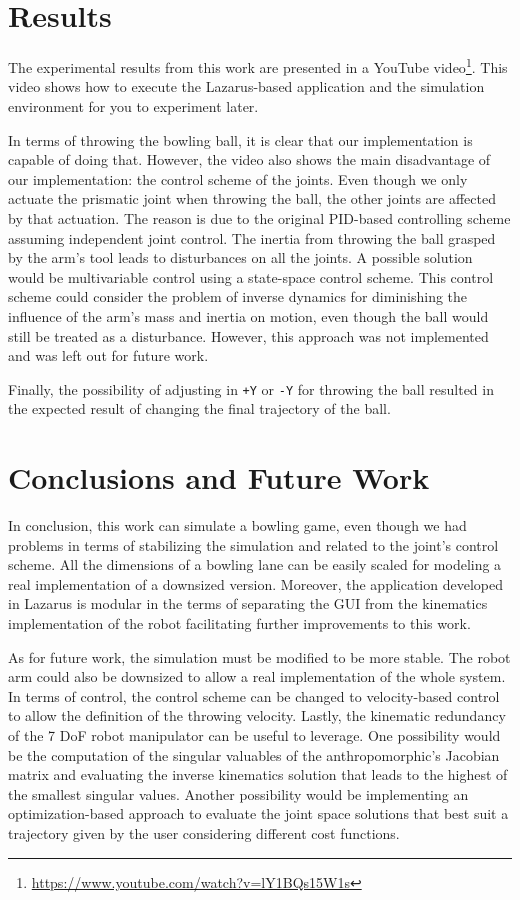 \documentclass[10pt,a4paper,notitlepage,twocolumn,twoside]{article}
\begin{document}
\section{Results}
\label{sec:results}

The experimental results from this work are presented in a YouTube video\footnote{\url{https://www.youtube.com/watch?v=lY1BQs15W1s}}. This video shows how to execute the Lazarus-based application and the simulation environment for you to experiment later.

In terms of throwing the bowling ball, it is clear that our implementation is capable of doing that. However, the video also shows the main disadvantage of our implementation: the control scheme of the joints. Even though we only actuate the prismatic joint when throwing the ball, the other joints are affected by that actuation. The reason is due to the original PID-based controlling scheme assuming independent joint control. The inertia from throwing the ball grasped by the arm's tool leads to disturbances on all the joints. A possible solution would be multivariable control using a state-space control scheme. This control scheme could consider the problem of inverse dynamics for diminishing the influence of the arm's mass and inertia on motion, even though the ball would still be treated as a disturbance. However, this approach was not implemented and was left out for future work.

Finally, the possibility of adjusting in \texttt{+Y} or \texttt{-Y} for throwing the ball resulted in the expected result of changing the final trajectory of the ball. 

\section{Conclusions and Future Work}
\label{sec:conclusions}

In conclusion, this work can simulate a bowling game, even though we had problems in terms of stabilizing the simulation and related to the joint's control scheme. All the dimensions of a bowling lane can be easily scaled for modeling a real implementation of a downsized version. Moreover, the application developed in Lazarus is modular in the terms of separating the GUI from the kinematics implementation of the robot facilitating further improvements to this work.

As for future work, the simulation must be modified to be more stable. The robot arm could also be downsized to allow a real implementation of the whole system. In terms of control, the control scheme can be changed to velocity-based control to allow the definition of the throwing velocity. Lastly, the kinematic redundancy of the 7 DoF robot manipulator can be useful to leverage. One possibility would be the computation of the singular valuables of the anthropomorphic's Jacobian matrix and evaluating the inverse kinematics solution that leads to the highest of the smallest singular values. Another possibility would be implementing an optimization-based approach to evaluate the joint space solutions that best suit a trajectory given by the user considering different cost functions.




\end{document}
